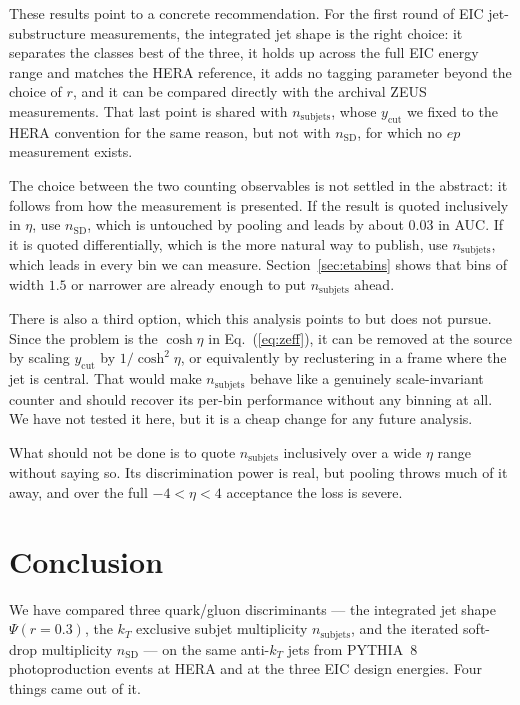 \documentclass[reprint,amsmath,amssymb,aps,prd,floatfix]{revtex4-2}
\begin{document}
These results point to a concrete recommendation. For the first round of EIC
jet-substructure measurements, the integrated jet shape is the right choice: it
separates the classes best of the three, it holds up across the full EIC energy
range and matches the HERA reference, it adds no tagging parameter beyond the
choice of $r$, and it can be compared directly with the archival ZEUS
measurements. That last point is shared with $n_{\mathrm{subjets}}$, whose
$y_{\mathrm{cut}}$ we fixed to the HERA convention for the same reason, but not
with $n_{\mathrm{SD}}$, for which no $ep$ measurement exists.

The choice between the two counting observables is not settled in the abstract:
it follows from how the measurement is presented. If the result is quoted
inclusively in $\eta$, use $n_{\mathrm{SD}}$, which is untouched by pooling and
leads by about $0.03$ in AUC. If it is quoted differentially, which is the more
natural way to publish, use $n_{\mathrm{subjets}}$, which leads in every bin we
can measure. Section~\ref{sec:etabins} shows that bins of width $1.5$ or
narrower are already enough to put $n_{\mathrm{subjets}}$ ahead.

There is also a third option, which this analysis points to but does not pursue.
Since the problem is the $\cosh\eta$ in Eq.~(\ref{eq:zeff}), it can be removed
at the source by scaling $y_{\mathrm{cut}}$ by $1/\cosh^2\eta$, or equivalently
by reclustering in a frame where the jet is central. That would make
$n_{\mathrm{subjets}}$ behave like a genuinely scale-invariant counter and
should recover its per-bin performance without any binning at all. We have not
tested it here, but it is a cheap change for any future analysis.

What should not be done is to quote $n_{\mathrm{subjets}}$ inclusively over a
wide $\eta$ range without saying so. Its discrimination power is real, but
pooling throws much of it away, and over the full $-4 < \eta < 4$ acceptance the
loss is severe.

\section{Conclusion}\label{sec:conclusion}

We have compared three quark/gluon discriminants --- the integrated jet shape
$\Psi(r=0.3)$, the $k_T$ exclusive subjet multiplicity $n_{\mathrm{subjets}}$,
and the iterated soft-drop multiplicity $n_{\mathrm{SD}}$ --- on the same
anti-$k_T$ jets from PYTHIA~8 photoproduction events at HERA and at the three EIC
design energies. Four things came out of it.
\end{document}
